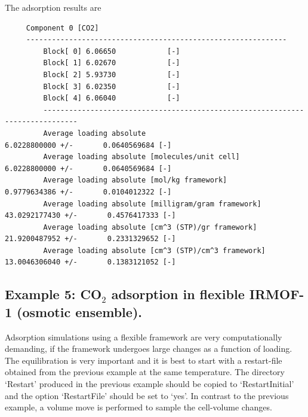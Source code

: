 \noindent
The adsorption results are
\begin{tiny}
\begin{verbatim}
     Component 0 [CO2]
     -------------------------------------------------------------
         Block[ 0] 6.06650            [-]
         Block[ 1] 6.02670            [-]
         Block[ 2] 5.93730            [-]
         Block[ 3] 6.02350            [-]
         Block[ 4] 6.06040            [-]
         ------------------------------------------------------------------------------
         Average loading absolute                              6.0228800000 +/-       0.0640569684 [-]
         Average loading absolute [molecules/unit cell]        6.0228800000 +/-       0.0640569684 [-]
         Average loading absolute [mol/kg framework]                  0.9779634386 +/-       0.0104012322 [-]
         Average loading absolute [milligram/gram framework]         43.0292177430 +/-       0.4576417333 [-]
         Average loading absolute [cm^3 (STP)/gr framework]          21.9200487952 +/-       0.2331329652 [-]
         Average loading absolute [cm^3 (STP)/cm^3 framework]        13.0046306040 +/-       0.1383121052 [-]
\end{verbatim}
\end{tiny}

\subsection*{Example 5: CO$_2$ adsorption in flexible IRMOF-1 (osmotic ensemble).}

Adsorption simulations using a flexible framework are very computationally demanding,
if the framework undergoes large changes as a function of loading.
The equilibration is very important and it is best to start with a restart-file
obtained from the previous example at the same temperature. The directory `Restart' produced in the previous
example should be copied to `RestartInitial' and the option `RestartFile' should be set to `yes'.
In contrast to the previous example, a volume move is performed to sample the cell-volume changes.

